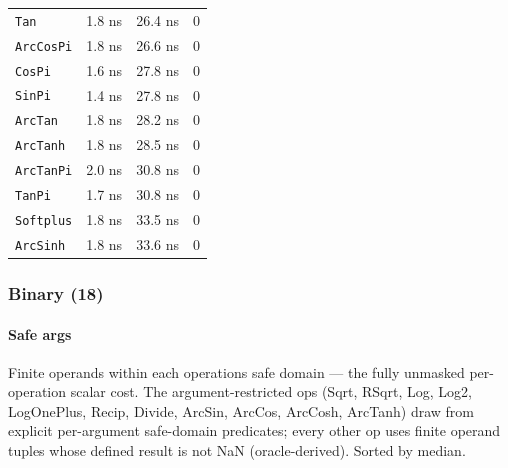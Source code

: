 \begin{table}[h]
\begin{tabulary}{\linewidth}{L L L L}
\texttt{Tan} & 1.8 ns & 26.4 ns & 0 \\
\texttt{ArcCosPi} & 1.8 ns & 26.6 ns & 0 \\
\texttt{CosPi} & 1.6 ns & 27.8 ns & 0 \\
\texttt{SinPi} & 1.4 ns & 27.8 ns & 0 \\
\texttt{ArcTan} & 1.8 ns & 28.2 ns & 0 \\
\texttt{ArcTanh} & 1.8 ns & 28.5 ns & 0 \\
\texttt{ArcTanPi} & 2.0 ns & 30.8 ns & 0 \\
\texttt{TanPi} & 1.7 ns & 30.8 ns & 0 \\
\texttt{Softplus} & 1.8 ns & 33.5 ns & 0 \\
\texttt{ArcSinh} & 1.8 ns & 33.6 ns & 0 \\
\bottomrule
\end{tabulary}

\end{table}




\clearpage



\subsubsection{Binary (18)}



\label{9493958918153706001}{}


\paragraph{Safe args}\indent



\label{1931488528371625443}{}


Finite operands within each operation{\textquotesingle}s safe domain — the fully unmasked per-operation scalar cost. The argument-restricted ops (Sqrt, RSqrt, Log, Log2, LogOnePlus, Recip, Divide, ArcSin, ArcCos, ArcCosh, ArcTanh) draw from explicit per-argument safe-domain predicates; every other op uses finite operand tuples whose defined result is not NaN (oracle-derived). Sorted by median.




